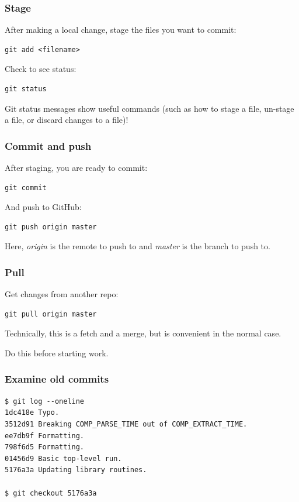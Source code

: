 \documentclass{beamer}
\begin{document}
\begin{frame}[fragile]
  \frametitle{Stage}
After making a local change, stage the files you want to commit:
  \begin{lstlisting}
git add <filename>
  \end{lstlisting}
Check to see status:
  \begin{lstlisting}
git status
  \end{lstlisting}
Git status messages show useful commands (such as how to stage a file, un-stage a file, or discard changes to a file)!
\end{frame}

\begin{frame}[fragile]
  \frametitle{Commit and push}
After staging, you are ready to commit:
  \begin{lstlisting}
git commit
  \end{lstlisting}
And push to GitHub:
  \begin{lstlisting}
git push origin master
  \end{lstlisting}
Here, {\em origin} is the remote to push to and {\em master} is the branch to push to.
\end{frame}

\begin{frame}[fragile]
  \frametitle{Pull}
Get changes from another repo:
  \begin{lstlisting}
git pull origin master
  \end{lstlisting}
Technically, this is a fetch and a merge, but is convenient in the normal case.

\vspace{1em}

Do this before starting work.
\end{frame}

\begin{frame}[fragile]
  \frametitle{Examine old commits}
  \begin{small}
  \begin{lstlisting}
$ git log --oneline
1dc418e Typo.
3512d91 Breaking COMP_PARSE_TIME out of COMP_EXTRACT_TIME.
ee7db9f Formatting.
798f6d5 Formatting.
01456d9 Basic top-level run.
5176a3a Updating library routines.

$ git checkout 5176a3a
  \end{lstlisting}
  \end{small}
\end{frame}
\end{document}
